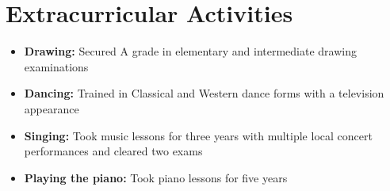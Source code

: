 \documentclass[a4paper,10pt]{report}
\newcommand{\resumeItem}[2]{
  \item\small{
    \textbf{#1}{ #2 \vspace{-2pt}}
  }
}
\newcommand{\resumeSubItem}[2]{\resumeItem{#1}{#2}\vspace{-4pt}}
\newcommand{\resumeSubHeadingListStart}{\begin{itemize}[leftmargin=*]}
\newcommand{\resumeSubHeadingListEnd}{\end{itemize}}
\begin{document}

\vspace{-5.5pt}
    \section{Extracurricular Activities}
        \resumeSubHeadingListStart
            \resumeSubItem{Drawing:}{Secured A grade in elementary and intermediate drawing examinations}
            \resumeSubItem{Dancing:}{Trained in Classical and Western dance forms with a television appearance}
            \resumeSubItem{Singing:}{Took music lessons for three years with multiple local concert performances and cleared two exams}
            \resumeSubItem{Playing the piano:}{Took piano lessons for five years}
        \resumeSubHeadingListEnd
\end{document}
